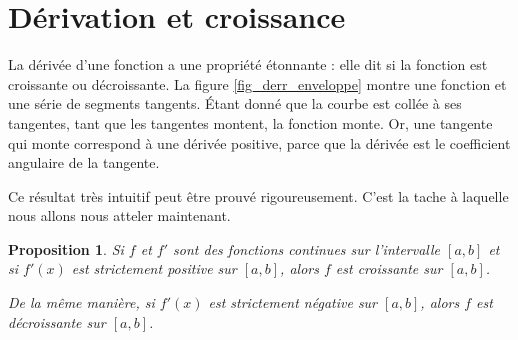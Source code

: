 \documentclass[a4paper,12pt]{book}
\newcounter{numtho}
\theoremstyle{mes_exemples}	\newtheorem{exemple}[numtho]{Exemple}
\theoremstyle{mes_tho}
\newtheorem{proposition}[numtho]{Proposition}
\begin{document}
					\section{Dérivation et croissance}

La dérivée d'une fonction a une propriété étonnante : elle dit si la fonction est croissante ou décroissante. La figure \ref{fig_derr_enveloppe} montre une fonction et une série de segments tangents. Étant donné que la courbe est \og collée \fg{} à ses tangentes, tant que les tangentes montent, la fonction monte. Or, une tangente qui monte correspond à une dérivée positive, parce que la dérivée est le coefficient angulaire de la tangente.

\newcommand{\CaptionDerrEnveloppe}{Quelque tangentes à la fonction $x\mapsto x^2/3$. Comme tu le vois, la fonction est \og collée\fg{} à ses tangentes.}


Ce résultat très intuitif peut être prouvé rigoureusement. C'est la tache à laquelle nous allons nous atteler maintenant.

\begin{proposition}
	Si $f$ et $f'$ sont des fonctions continues sur l'intervalle $[a,b]$ et si $f'(x)$ est strictement positive sur $[a,b]$, alors $f$ est croissante sur $[a,b]$.

	De la même manière, si $f'(x)$ est strictement négative sur $[a,b]$, alors $f$ est décroissante sur $[a,b]$.
\end{proposition}
\end{document}
